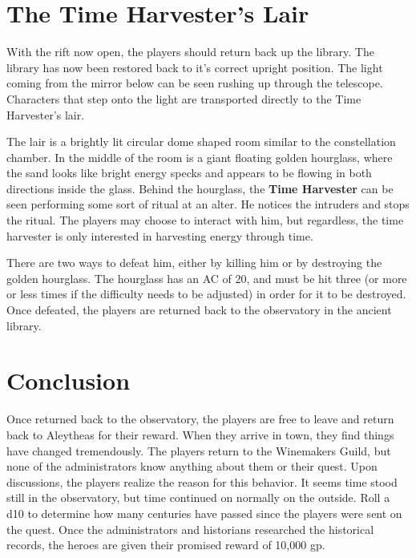 \documentclass{article}
\begin{document}
\begin{multicols*}{2}
	\section{The Time Harvester's Lair}
	With the rift now open, the players should return back up the library. The library has now been restored back to it's correct upright position. The light coming from the mirror below can be seen rushing up through the telescope. Characters that step onto the light are transported directly to the Time Harvester's lair.
	
	The lair is a brightly lit circular dome shaped room similar to the constellation chamber. In the middle of the room is a giant floating golden hourglass, where the sand looks like bright energy specks and appears to be flowing in both directions inside the glass. Behind the hourglass, the \textbf{Time Harvester} can be seen performing some sort of ritual at an alter. He notices the intruders and stops the ritual. The players may choose to interact with him, but regardless, the time harvester is only interested in harvesting energy through time.
	
	There are two ways to defeat him, either by killing him or by destroying the golden hourglass. The hourglass has an AC of 20, and must be hit three (or more or less times if the difficulty needs to be adjusted) in order for it to be destroyed. Once defeated, the players are returned back to the observatory in the ancient library. 
	
	\section{Conclusion}
	Once returned back to the observatory, the players are free to leave and return back to Aleytheas for their reward. When they arrive in town, they find things have changed tremendously. The players return to the Winemakers Guild, but none of the administrators know anything about them or their quest. Upon discussions, the players realize the reason for this behavior. It seems time stood still in the observatory, but time continued on normally on the outside. Roll a d10 to determine how many centuries have passed since the players were sent on the quest. Once the administrators and historians researched the historical records, the heroes are given their promised reward of 10,000 gp.

	
	
	
\end{multicols*}
	
\end{document}
